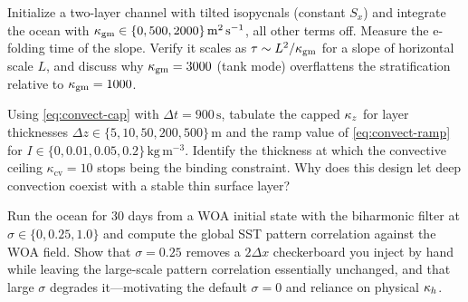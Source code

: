 \begin{exercise}
Initialize a two-layer channel with tilted isopycnals (constant $S_x$) and integrate
the ocean with $\kappa_{\mathrm{gm}}\in\{0,500,2000\}\,\mathrm{m^2\,s^{-1}}$, all other terms off.
Measure the e-folding time of the slope. Verify it scales as
$\tau\sim L^2/\kappa_{\mathrm{gm}}$ for a slope of horizontal scale $L$, and discuss why
$\kappa_{\mathrm{gm}}=3000$ (tank mode) overflattens the stratification relative to $\kappa_{\mathrm{gm}}=1000$.
\end{exercise}

\begin{exercise}
Using \eqref{eq:convect-cap} with $\Delta t = 900\,\mathrm{s}$, tabulate the capped
$\kappa_{z}$ for layer thicknesses $\Delta z\in\{5,10,50,200,500\}\,\mathrm{m}$ and the ramp
value of \eqref{eq:convect-ramp} for $I\in\{0,0.01,0.05,0.2\}\,\mathrm{kg\,m^{-3}}$.
Identify the thickness at which the convective ceiling $\kappa_{\mathrm{cv}}=10$ stops
being the binding constraint. Why does this design let deep convection coexist with a
stable thin surface layer?
\end{exercise}

\begin{exercise}
Run the ocean for 30 days from a WOA initial state with the biharmonic filter at
$\sigma\in\{0,0.25,1.0\}$ and compute the global SST pattern correlation against the
WOA field. Show that $\sigma=0.25$ removes a $2\Delta x$ checkerboard you inject by hand
while leaving the large-scale pattern correlation essentially unchanged, and that
large $\sigma$ degrades it---motivating the default $\sigma=0$ and reliance on physical
$\kappa_{h}$.
\end{exercise}

